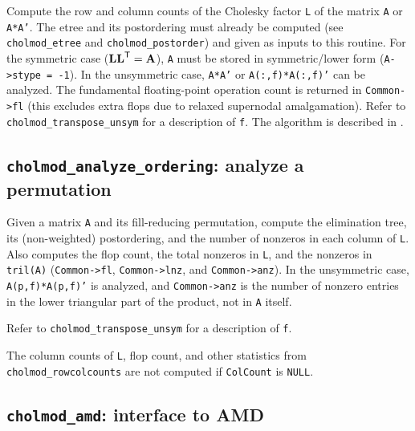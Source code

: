 \documentclass[11pt]{article}
\newcommand{\m}[1]{{\bf{#1}}}       %
\newcommand{\tr}{^{\sf T}}          %
\begin{document}

Compute the row and column counts of the Cholesky factor {\tt L} of the matrix
{\tt A} or {\tt A*A'}.  The etree and its postordering must already be computed (see
{\tt cholmod\_etree} and {\tt cholmod\_postorder}) and given as inputs to this routine.
For the symmetric case ($\m{LL}\tr=\m{A}$), {\tt A} must be stored in
symmetric/lower form ({\tt A->stype = -1}).
In the unsymmetric case, {\tt A*A'} or {\tt A(:,f)*A(:,f)'} can be analyzed.
The fundamental floating-point operation count is returned in {\tt Common->fl}
(this excludes extra flops due to relaxed supernodal amalgamation).
Refer to {\tt cholmod\_transpose\_unsym} for a description of {\tt f}.
The algorithm is described in \cite{GilbertLiNgPeyton01,GilbertNgPeyton94}.

% 

\subsection{{\tt cholmod\_analyze\_ordering}: analyze a permutation}


Given a matrix {\tt A} and its fill-reducing permutation, compute the elimination
tree, its (non-weighted) postordering, and the number of nonzeros in each
column of {\tt L}.  Also computes the flop count, the total nonzeros in {\tt L}, and
the nonzeros in {\tt tril(A)} ({\tt Common->fl}, {\tt Common->lnz}, and {\tt Common->anz}).
In the unsymmetric case, {\tt A(p,f)*A(p,f)'} is analyzed, and {\tt Common->anz}
is the number of nonzero entries in the lower triangular part of the product,
not in {\tt A} itself.

Refer to {\tt cholmod\_transpose\_unsym} for a description of {\tt f}.

The column counts of {\tt L}, flop count, and other statistics from
{\tt cholmod\_rowcolcounts} are not computed if {\tt ColCount} is {\tt NULL}.

\subsection{{\tt cholmod\_amd}: interface to AMD}
\end{document}
